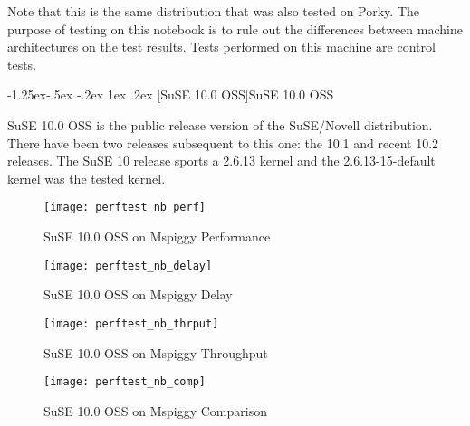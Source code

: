 \documentclass[letterpaper,final,notitlepage,twocolumn,10pt,twoside]{article}
\makeatletter
\let\normalsize = \small
\let\small = \footnotesize
\let\footnotesize = \scriptsize
\let\scriptsize = \tiny
\renewcommand\subsubsection{\@startsection{subsubsection}{3}{\z@}%
                                     {-1.25ex\@plus -.5ex \@minus -.2ex}%
                                     {1ex \@plus .2ex}%
                                     {\normalfont\normalsize\bfseries}}
\makeatother
\begin{document}
Note that this is the same distribution that was also tested on Porky.  The purpose of testing on
this notebook is to rule out the differences between machine architectures on the test results.
Tests performed on this machine are control tests.

\subsubsection[SuSE 10.0 OSS]{SuSE 10.0 OSS}

SuSE 10.0 OSS is the public release version of the SuSE/Novell distribution.  There have been two
releases subsequent to this one: the 10.1 and recent 10.2 releases.  The SuSE 10 release sports a
2.6.13 kernel and the 2.6.13-15-default kernel was the tested kernel.

\begin{figure}[p]
\texttt{[image: perftest\_nb\_perf]}
\caption[SuSE 10.0 OSS on Mspiggy Performance]{SuSE 10.0 OSS on Mspiggy Performance}
\label{figure:nbperf}
\end{figure}

\begin{figure}[p]
\texttt{[image: perftest\_nb\_delay]}
\caption[SuSE 10.0 OSS on Mspiggy Delay]{SuSE 10.0 OSS on Mspiggy Delay}
\label{figure:nbdelay}
\end{figure}

\begin{figure}[p]
\texttt{[image: perftest\_nb\_thrput]}
\caption[SuSE 10.0 OSS on Mspiggy Throughput]{SuSE 10.0 OSS on Mspiggy Throughput}
\label{figure:nbthrput}
\end{figure}

\begin{figure}[pt]
\texttt{[image: perftest\_nb\_comp]}
\caption[SuSE 10.0 OSS on Mspiggy Comparison]{SuSE 10.0 OSS on Mspiggy Comparison}
\label{figure:nbcomp}
\end{figure}
\end{document}
